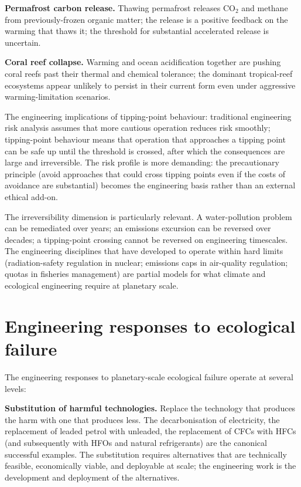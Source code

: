 \textbf{Permafrost carbon release.} Thawing permafrost releases CO$_2$ and methane from previously-frozen organic matter; the release is a positive feedback on the warming that thaws it; the threshold for substantial accelerated release is uncertain.

\textbf{Coral reef collapse.} Warming and ocean acidification together are pushing coral reefs past their thermal and chemical tolerance; the dominant tropical-reef ecosystems appear unlikely to persist in their current form even under aggressive warming-limitation scenarios.

The engineering implications of tipping-point behaviour: traditional engineering risk analysis assumes that more cautious operation reduces risk smoothly; tipping-point behaviour means that operation that approaches a tipping point can be safe up until the threshold is crossed, after which the consequences are large and irreversible. The risk profile is more demanding: the precautionary principle (avoid approaches that could cross tipping points even if the costs of avoidance are substantial) becomes the engineering basis rather than an external ethical add-on.

The irreversibility dimension is particularly relevant. A water-pollution problem can be remediated over years; an emissions excursion can be reversed over decades; a tipping-point crossing cannot be reversed on engineering timescales. The engineering disciplines that have developed to operate within hard limits (radiation-safety regulation in nuclear; emissions caps in air-quality regulation; quotas in fisheries management) are partial models for what climate and ecological engineering require at planetary scale.

\section{Engineering responses to ecological failure}

The engineering responses to planetary-scale ecological failure operate at several levels:

\textbf{Substitution of harmful technologies.} Replace the technology that produces the harm with one that produces less. The decarbonisation of electricity, the replacement of leaded petrol with unleaded, the replacement of CFCs with HFCs (and subsequently with HFOs and natural refrigerants) are the canonical successful examples. The substitution requires alternatives that are technically feasible, economically viable, and deployable at scale; the engineering work is the development and deployment of the alternatives.

